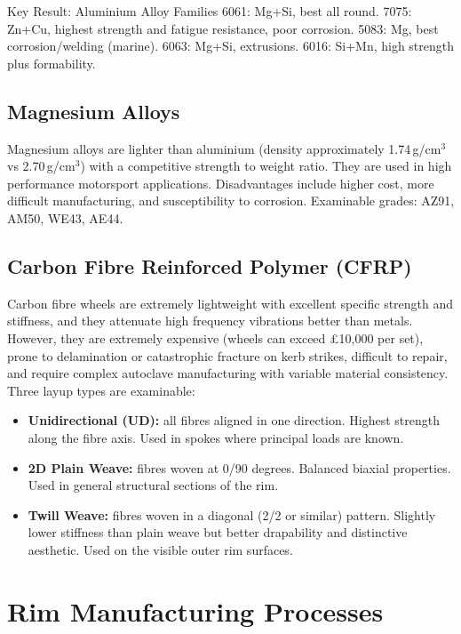 \documentclass[10pt,a4paper]{article}
\begin{document}
\begin{keybox}{Key Result: Aluminium Alloy Families}
6061: Mg+Si, best all round. 7075: Zn+Cu, highest strength and fatigue resistance, poor corrosion. 5083: Mg, best corrosion/welding (marine). 6063: Mg+Si, extrusions. 6016: Si+Mn, high strength plus formability.
\end{keybox}

\subsection{Magnesium Alloys}

Magnesium alloys are lighter than aluminium (density approximately 1.74\,g/cm$^3$ vs 2.70\,g/cm$^3$) with a competitive strength to weight ratio. They are used in high performance motorsport applications. Disadvantages include higher cost, more difficult manufacturing, and susceptibility to corrosion. Examinable grades: AZ91, AM50, WE43, AE44.

\subsection{Carbon Fibre Reinforced Polymer (CFRP)}

Carbon fibre wheels are extremely lightweight with excellent specific strength and stiffness, and they attenuate high frequency vibrations better than metals. However, they are extremely expensive (wheels can exceed £10{,}000 per set), prone to delamination or catastrophic fracture on kerb strikes, difficult to repair, and require complex autoclave manufacturing with variable material consistency. Three layup types are examinable:
\begin{itemize}
\item \textbf{Unidirectional (UD):} all fibres aligned in one direction. Highest strength along the fibre axis. Used in spokes where principal loads are known.
\item \textbf{2D Plain Weave:} fibres woven at 0/90 degrees. Balanced biaxial properties. Used in general structural sections of the rim.
\item \textbf{Twill Weave:} fibres woven in a diagonal (2/2 or similar) pattern. Slightly lower stiffness than plain weave but better drapability and distinctive aesthetic. Used on the visible outer rim surfaces.
\end{itemize}

\section{Rim Manufacturing Processes}
\end{document}
